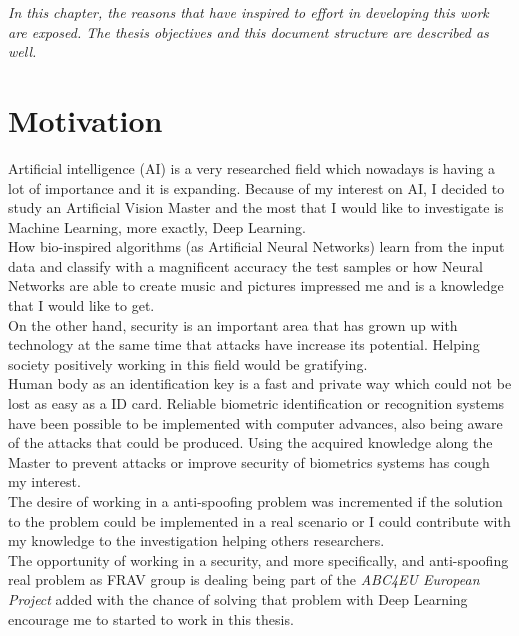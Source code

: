 \minitoc
\mtcskip

\begin{small}
\emph{In this chapter, the reasons that have inspired to effort in developing this work are exposed. The thesis objectives and this document structure are described as well.\\}
\end{small}
\section{Motivation}
Artificial intelligence (AI) is a very researched field which nowadays is having a lot of importance and it is expanding. Because of my interest on AI,  I decided to study an Artificial Vision Master and the most that I would like to investigate is Machine Learning, more exactly, Deep Learning.\\

How bio-inspired algorithms (as Artificial Neural Networks) learn from the input data and classify with a magnificent accuracy the test samples or how Neural Networks are able to create music and pictures impressed me and is a knowledge that I would like to get.\\

On the other hand, security is an important area that has grown up with technology at the same time that attacks have increase its potential. Helping society positively working in this field would be gratifying.\\

Human body as an identification key is a fast and private way which could not be lost as easy as a ID card. Reliable biometric identification or recognition  systems have been possible to be implemented with computer advances, also being aware of the attacks that could be produced. Using the acquired knowledge along the Master to prevent attacks or improve security of biometrics systems has cough my interest.\\

The desire of working in a anti-spoofing problem was incremented if the solution to the problem could be implemented in a real scenario or I could contribute with my knowledge to the investigation helping others researchers.\\

The opportunity of working in a security, and more specifically, and anti-spoofing real problem as FRAV group is dealing being part of the \textit{ABC4EU European Project} added with the chance of solving that problem with Deep Learning encourage me to started to work in this thesis.\\

